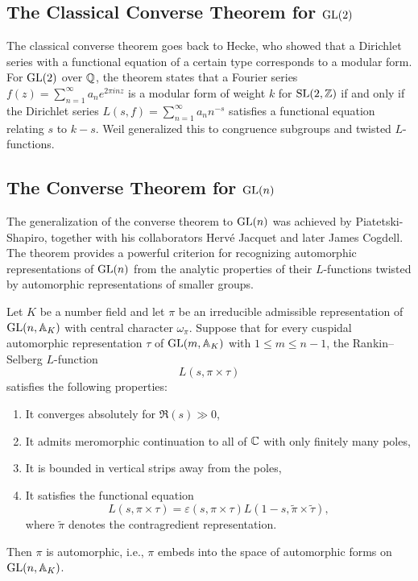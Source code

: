 \subsection{The Classical Converse Theorem for \texorpdfstring{\(\operatorname{GL}(2)\)}{GL(2)}}

The classical converse theorem goes back to Hecke, who showed that a Dirichlet series with a functional equation of a certain type corresponds to a modular form. For \(\operatorname{GL}(2)\) over \(\mathbb{Q}\), the theorem states that a Fourier series \(f(z) = \sum_{n=1}^\infty a_n e^{2\pi i n z}\) is a modular form of weight \(k\) for \(\operatorname{SL}(2,\mathbb{Z})\) if and only if the Dirichlet series \(L(s,f) = \sum_{n=1}^\infty a_n n^{-s}\) satisfies a functional equation relating \(s\) to \(k-s\). Weil generalized this to congruence subgroups and twisted \(L\)-functions.

\subsection{The Converse Theorem for \texorpdfstring{\(\operatorname{GL}(n)\)}{GL(n)}}

The generalization of the converse theorem to \(\operatorname{GL}(n)\) was achieved by Piatetski-Shapiro, together with his collaborators Herv\'{e} Jacquet and later James Cogdell. The theorem provides a powerful criterion for recognizing automorphic representations of \(\operatorname{GL}(n)\) from the analytic properties of their \(L\)-functions twisted by automorphic representations of smaller groups.

\begin{theorem}
Let \(K\) be a number field and let \(\pi\) be an irreducible admissible representation of \(\operatorname{GL}(n,\mathbb{A}_K)\) with central character \(\omega_\pi\). Suppose that for every cuspidal automorphic representation \(\tau\) of \(\operatorname{GL}(m,\mathbb{A}_K)\) with \(1 \leq m \leq n-1\), the Rankin--Selberg \(L\)-function
\[
L(s, \pi \times \tau)
\]
satisfies the following properties:
\begin{enumerate}
    \item It converges absolutely for \(\Re(s) \gg 0\),
    \item It admits meromorphic continuation to all of \(\mathbb{C}\) with only finitely many poles,
    \item It is bounded in vertical strips away from the poles,
    \item It satisfies the functional equation
    \[
    L(s, \pi \times \tau) = \varepsilon(s, \pi \times \tau) L(1-s, \widetilde{\pi} \times \widetilde{\tau}),
    \]
    where \(\widetilde{\pi}\) denotes the contragredient representation.
\end{enumerate}
Then \(\pi\) is automorphic, i.e., \(\pi\) embeds into the space of automorphic forms on \(\operatorname{GL}(n,\mathbb{A}_K)\).
\end{theorem}

